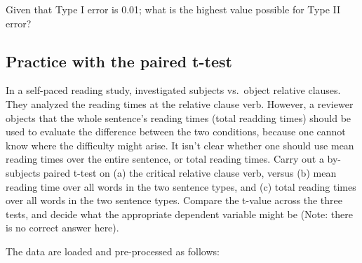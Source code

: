 \documentclass[12pt,]{krantz}
\newenvironment{Shaded}{\begin{snugshade}}{\end{snugshade}}
\newcommand{\CommentTok}[1]{\textcolor[rgb]{0.56,0.35,0.01}{\textit{#1}}}
\newcommand{\DataTypeTok}[1]{\textcolor[rgb]{0.13,0.29,0.53}{#1}}
\newcommand{\DecValTok}[1]{\textcolor[rgb]{0.00,0.00,0.81}{#1}}
\newcommand{\KeywordTok}[1]{\textcolor[rgb]{0.13,0.29,0.53}{\textbf{#1}}}
\newcommand{\NormalTok}[1]{#1}
\newcommand{\OperatorTok}[1]{\textcolor[rgb]{0.81,0.36,0.00}{\textbf{#1}}}
\newcommand{\OtherTok}[1]{\textcolor[rgb]{0.56,0.35,0.01}{#1}}
\newcommand{\StringTok}[1]{\textcolor[rgb]{0.31,0.60,0.02}{#1}}
\begin{document}
Given that Type I error is 0.01; what is the highest value possible for Type II error?

\hypertarget{practice-with-the-paired-t-test}{%
\subsection{Practice with the paired t-test}\label{practice-with-the-paired-t-test}}

In a self-paced reading study, \citet{grodner} investigated subjects vs.~object relative clauses. They analyzed the reading times at the relative clause verb. However, a reviewer objects that the whole sentence's reading times (total readding times) should be used to evaluate the difference between the two conditions, because one cannot know where the difficulty might arise. It isn't clear whether one should use mean reading times over the entire sentence, or total reading times.
Carry out a by-subjects paired t-test on (a) the critical relative clause verb, versus (b) mean reading time over all words in the two sentence types, and (c) total reading times over all words in the two sentence types. Compare the t-value across the three tests, and decide what the appropriate dependent variable might be (Note: there is no correct answer here).

The data are loaded and pre-processed as follows:

\begin{Shaded}
\end{Shaded}
\end{document}
